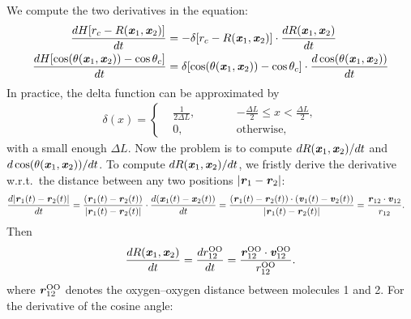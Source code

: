 \documentclass[unsortedaddress,a4paper,onecolumn]{revtex4}
\newcommand{\vect}[1]{\textbf{\textit{#1}}}
\newcommand{\oxy}[0]{{\textrm{O}}}
\begin{document}
We compute the two derivatives in the equation:
\begin{align}
  \frac{dH [r_c - R(\vect x_1, \vect x_2)]}{dt}
  &=
  -\delta[r_c - R(\vect x_1, \vect x_2)]
  \cdot  \frac{dR(\vect x_1, \vect x_2)}{dt} \\
  \frac{dH[\cos(\theta(\vect x_1, \vect x_2)) - \cos \theta_c]}{dt}
  &=
  \delta[\cos(\theta(\vect x_1, \vect x_2)) - \cos \theta_c]
  \cdot \frac{d \cos(\theta(\vect x_1, \vect x_2))}{dt}
\end{align}
In practice, the delta function can be approximated by
\begin{align}
  \delta(x) =
  \left\{
    \begin{alignedat}{3}
      &\frac 1{2\Delta L}, &\qquad& -\frac{\Delta L}{2} \leq x < \frac{\Delta L}{2}, \\
      & 0, &     & \textrm{otherwise},
    \end{alignedat}
  \right.
\end{align}
with a small enough $\Delta L$.
Now the problem is to compute $dR(\vect x_1, \vect x_2)/dt$ and $d
\cos(\theta(\vect x_1, \vect x_2))/dt$. To compute $dR(\vect x_1,
\vect x_2)/dt$, we fristly derive the derivative w.r.t.~the distance
between any two positions $\vert \vect r_1 - \vect r_2\vert$:
\begin{align} 
  \frac{d\vert \vect r_1(t) - \vect r_2(t)\vert}{dt}
  &=
  \frac{( \vect r_1(t) - \vect r_2(t) )}{  \vert \vect r_1(t) - \vect r_2(t)\vert} \cdot
  \frac{ d( \vect x_1(t) - \vect x_2(t) )}{dt}  
  =
  \frac{( \vect r_1(t) - \vect r_2(t) ) \cdot (\vect v_1(t) - \vect v_2(t))}{  \vert \vect r_1(t) - \vect r_2(t)\vert} 
  =
  \frac{\vect r_{12}\cdot \vect v_{12}}{r_{12}}.
\end{align}
Then
\begin{align}
  \frac{dR(\vect x_1, \vect x_2)}{dt} = \frac{d r^{\oxy\oxy}_{12}}{dt} = \frac{\vect r^{\oxy\oxy}_{12}\cdot \vect v^{\oxy\oxy}_{12}}{r^{\oxy\oxy}_{12}}.
\end{align}
where $\vect r_{12}^{\oxy\oxy}$ denotes the oxygen--oxygen distance between molecules 1 and 2. For the derivative of the cosine angle:
\end{document}
